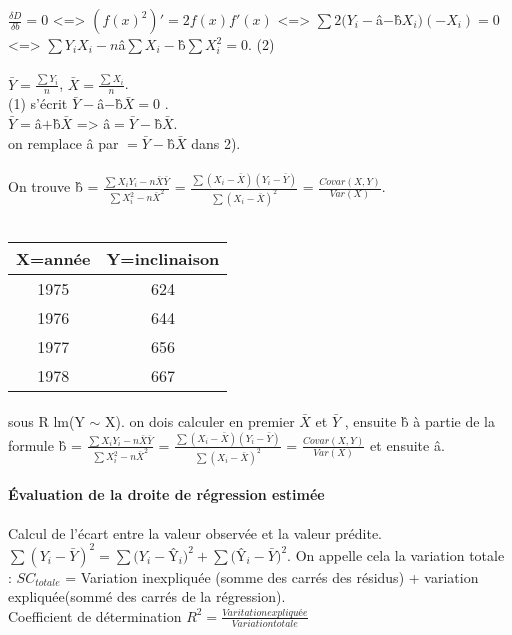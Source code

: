 \documentclass{article}
\begin{document}
$\frac{\delta D}{\delta b} = 0$ <=> $(f(x)^2)' = 2f(x)f'(x)$ <=> $\sum 2(Y_i-$\^a$-$\^b$X_i)(-X_i) = 0$ <=> $\sum Y_iX_i - n$\^a$\sum X_i-$\^b$\sum X_i^2=0$. (2)\\\\

$\bar{Y} = \frac{ \sum Y_i}{n}$, $\bar{X} = \frac{\sum X_i}{n}$.\\
(1) s'écrit $\bar{Y}-$\^a$-$\^b$\bar{X}=0$ .\\
$\bar{Y}=$\^a$+$\^b$\bar{X}$ => \^a$=\bar{Y}-$\^b$\bar{X}$.\\on remplace \^a par  $=\bar{Y}-$\^b$\bar{X}$ dans 2).\\\\On trouve \^b = $\frac{\sum X_iY_i-n\bar{X}\bar{Y}}{\sum X_i^2 -n\bar{X}^2} $ = $\frac{\sum (X_i-\bar{X})(Y_i-\bar{Y})}{\sum (X_i -\bar{X})^2} $ = $\frac{Covar(X,Y)}{Var(X)}$.\\\\

\begin{tabular}{|c|c|}
\hline
X=année & Y=inclinaison \\ \hline
1975 & 624 \\ \hline
1976 & 644 \\ \hline
1977 & 656 \\ \hline
1978 & 667 \\\hline
\end{tabular}
\paragraph{} sous R lm(Y $\sim$ X). on dois calculer en premier $\bar{X}$ et $\bar{Y}$ , ensuite  \^b à partie de la formule \^b = $\frac{\sum X_iY_i-n\bar{X}\bar{Y}}{\sum X_i^2 -n\bar{X}^2} $ = $\frac{\sum (X_i-\bar{X})(Y_i-\bar{Y})}{\sum (X_i -\bar{X})^2} $ = $\frac{Covar(X,Y)}{Var(X)}$ et ensuite \^a.
\paragraph{Évaluation de la droite de régression estimée} Calcul de l'écart entre la valeur observée et la valeur prédite.\\$\sum (Y_i-\bar{Y})^2 = \sum (Y_i-$\^Y$_i)^2+ \sum($\^Y$_i-\bar{Y})^2$. On appelle cela la variation totale : $SC_{totale}$  =  Variation inexpliquée (somme des carrés des résidus) + variation expliquée(sommé des carrés de la régression).\\Coefficient de détermination $R^2 = \frac{Varitation expliquée}{Variation totale}$ 
\end{document}
